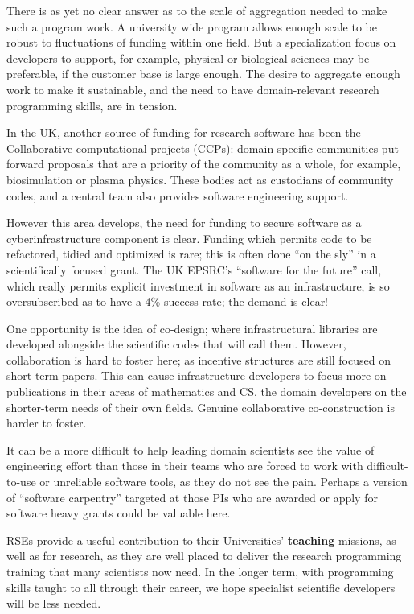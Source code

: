 There is as yet no clear answer as to the scale of aggregation needed to
make such a program work. A university wide program allows enough scale to
be robust to fluctuations of funding within one field.
But a specialization focus on developers to support, for example,
physical or biological
sciences may be preferable, if the customer base is large enough.
The desire to aggregate enough work to make it sustainable, and the need to
have domain-relevant research programming skills, are in tension.

In the UK, another source of funding for research software has been the
Collaborative computational projects (CCPs): domain specific communities put
forward proposals that are a priority of the community as a whole, for example,
biosimulation or plasma physics. These bodies act as custodians of community codes,
and a central team also provides software engineering support.

However this area develops, the need for funding to secure software as a
cyberinfrastructure component is clear. Funding which permits code to be
refactored, tidied and optimized  is rare; this is often done ``on the sly''
in a scientifically focused grant. The UK EPSRC's ``software for the future''
call, which really permits explicit investment in software as an infrastructure,
is so oversubscribed as to have a 4\% success rate; the demand is clear!

One opportunity is the idea of co-design; where infrastructural libraries are
developed alongside the scientific codes that will call them. However,
collaboration is hard to foster here; as incentive structures are still focused
on short-term papers. This can cause infrastructure developers to
focus more on publications
in their areas of mathematics and CS, the domain developers on the shorter-term
needs of their own fields. Genuine collaborative co-construction
is harder to foster.

It can be a more difficult
to help leading domain scientists see the value of engineering effort than those
in their teams who are forced to work with difficult-to-use or unreliable
software tools, as they do not see the pain. Perhaps a version of
``software carpentry'' targeted at those PIs
who are awarded or apply for software heavy grants could be valuable here.

RSEs provide a useful contribution to their Universities' \textbf{teaching} missions,
as well as for research, as they are well placed to deliver the research programming
training that many scientists now need. In the
longer term, with programming skills taught to all through their career,
we hope specialist
scientific developers will be less needed.


